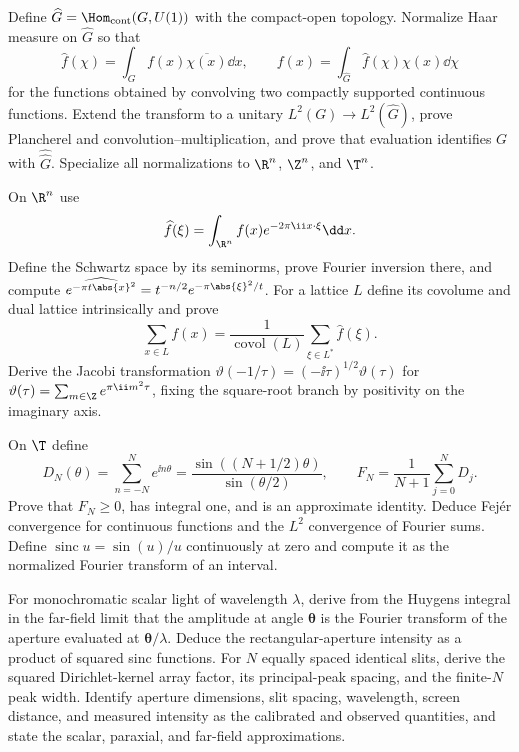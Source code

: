 \begin{exercise}
Define $\widehat G=\Hom_{\mathrm{cont}}(G,U(1))$ with the compact-open
topology.  Normalize Haar measure on $\widehat G$ so that
\[
 \widehat f(\chi)=\int_G f(x)\overline{\chi(x)}\dd x,
 \qquad
 f(x)=\int_{\widehat G}\widehat f(\chi)\chi(x)\dd\chi
\]
for the functions obtained by convolving two compactly supported continuous
functions.  Extend the transform to a unitary
$L^2(G)\to L^2(\widehat G)$, prove Plancherel and convolution--multiplication,
and prove that evaluation identifies $G$ with $\widehat{\widehat G}$.
Specialize all normalizations to $\R^n$, $\Z^n$, and $\T^n$.
\end{exercise}

\begin{exercise}
On $\R^n$ use
\[
 \widehat f(\xi)=\int_{\R^n}f(x)e^{-2\pi\ii x\cdot\xi}\dd x.
\]
Define the Schwartz space by its seminorms, prove Fourier inversion there,
and compute $\widehat{e^{-\pi t\abs{x}^2}}=t^{-n/2}
e^{-\pi\abs{\xi}^2/t}$.  For a lattice $L$ define its covolume and dual
lattice intrinsically and prove
\[
 \sum_{x\in L}f(x)=\frac1{\operatorname{covol}(L)}
 \sum_{\xi\in L^*}\widehat f(\xi).
\]
Derive the Jacobi transformation
$\vartheta(-1/\tau)=(-\ii\tau)^{1/2}\vartheta(\tau)$ for
$\vartheta(\tau)=\sum_{m\in\Z}e^{\pi\ii m^2\tau}$, fixing the square-root
branch by positivity on the imaginary axis.
\end{exercise}

\begin{exercise}
On $\T$ define
\[
 D_N(\theta)=\sum_{n=-N}^Ne^{\ii n\theta}
 =\frac{\sin((N+1/2)\theta)}{\sin(\theta/2)},\qquad
 F_N=\frac1{N+1}\sum_{j=0}^ND_j .
\]
Prove that $F_N\ge0$, has integral one, and is an approximate identity.
Deduce Fej\'er convergence for continuous functions and the $L^2$ convergence
of Fourier sums.  Define $\operatorname{sinc}u=\sin(u)/u$ continuously at
zero and compute it as the normalized Fourier transform of an interval.
\end{exercise}

\begin{exercise}
For monochromatic scalar light of wavelength $\lambda$, derive from the
Huygens integral in the far-field limit that the amplitude at angle
$\boldsymbol\theta$ is the Fourier transform of the aperture evaluated at
$\boldsymbol\theta/\lambda$.  Deduce the rectangular-aperture intensity as a
product of squared sinc functions.  For $N$ equally spaced identical slits,
derive the squared Dirichlet-kernel array factor, its principal-peak spacing,
and the finite-$N$ peak width.  Identify aperture dimensions, slit spacing,
wavelength, screen distance, and measured intensity as the calibrated and
observed quantities, and state the scalar, paraxial, and far-field
approximations.
\end{exercise}

